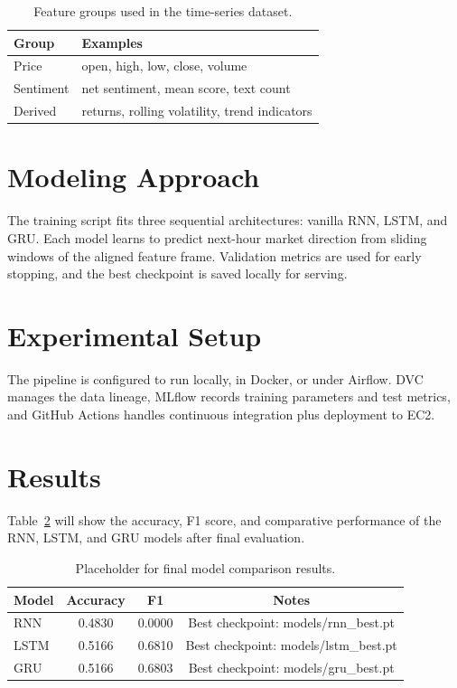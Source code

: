 \documentclass[conference]{IEEEtran}
\begin{document}
\begin{table}[t]
\centering
\caption{Feature groups used in the time-series dataset.}
\label{tab:features}
\begin{tabular}{p{1.8cm}p{4.7cm}}
\toprule
Group & Examples \\
\midrule
Price & open, high, low, close, volume \\
Sentiment & net sentiment, mean score, text count \\
Derived & returns, rolling volatility, trend indicators \\
\bottomrule
\end{tabular}
\end{table}

\section{Modeling Approach}
The training script fits three sequential architectures: vanilla RNN, LSTM, and GRU. Each model learns to predict next-hour market direction from sliding windows of the aligned feature frame. Validation metrics are used for early stopping, and the best checkpoint is saved locally for serving.

\section{Experimental Setup}
The pipeline is configured to run locally, in Docker, or under Airflow. DVC manages the data lineage, MLflow records training parameters and test metrics, and GitHub Actions handles continuous integration plus deployment to EC2.

\section{Results}
Table~\ref{tab:results} will show the accuracy, F1 score, and comparative performance of the RNN, LSTM, and GRU models after final evaluation.

\begin{table}[t]
\centering
\caption{Placeholder for final model comparison results.}
\label{tab:results}
\begin{tabular}{lccc}
\toprule
Model & Accuracy & F1 & Notes \\
\midrule
RNN & 0.4830 & 0.0000 & Best checkpoint: models/rnn_best.pt \\
LSTM & 0.5166 & 0.6810 & Best checkpoint: models/lstm_best.pt \\
GRU & 0.5166 & 0.6803 & Best checkpoint: models/gru_best.pt \\
\bottomrule
\end{tabular}
\end{table}
\end{document}
